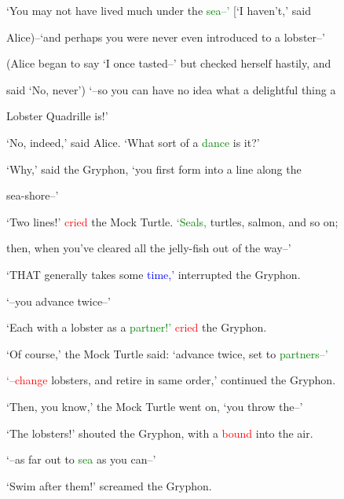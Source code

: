 ‘You may not have lived much under the \textcolor{green}{sea--’} [‘I haven’t,’ said

 Alice)--‘and perhaps you were never even introduced to a lobster--’

 (Alice began to say ‘I once tasted--’ but checked herself hastily, and

 said ‘No, never’) ‘--so you can have no idea what a \textcolor{BurntOrange}{delightful} thing a

 Lobster Quadrille is!’



 ‘No, indeed,’ said Alice. ‘What sort of a \textcolor{green}{dance} is it?’



 ‘Why,’ said the Gryphon, ‘you first form into a line along the

 sea-shore--’



 ‘Two lines!’ \textcolor{red}{cried} the Mock Turtle. \textcolor{green}{‘Seals,} turtles, salmon, and so on;

 then, when you’ve cleared all the jelly-fish out of the way--’



 ‘THAT generally takes some \textcolor{blue}{time,’} \textcolor{BurntOrange}{interrupted} the Gryphon.



 ‘--you \textcolor{BurntOrange}{advance} twice--’



 ‘Each with a lobster as a \textcolor{green}{partner!’} \textcolor{red}{cried} the Gryphon.



 ‘Of course,’ the Mock Turtle said: \textcolor{BurntOrange}{‘advance} twice, set to \textcolor{green}{partners--’}



 \textcolor{red}{‘--change} lobsters, and retire in same order,’ continued the Gryphon.



 ‘Then, you know,’ the Mock Turtle went on, ‘you throw the--’



 ‘The lobsters!’ \textcolor{BurntOrange}{shouted} the Gryphon, with a \textcolor{red}{bound} into the air.



 ‘--as far out to \textcolor{green}{sea} as you can--’



 \textcolor{BurntOrange}{‘Swim} after them!’ \textcolor{BurntOrange}{screamed} the Gryphon.



